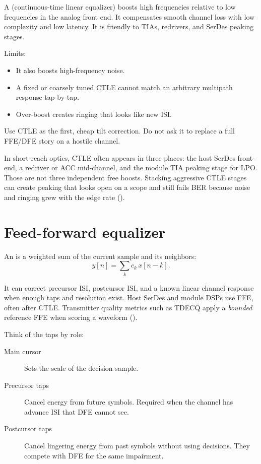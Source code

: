 A  (continuous-time linear equalizer) boosts high
frequencies relative to low frequencies in the analog front end. It compensates
smooth channel loss with low complexity and low latency. It is friendly to
TIAs, redrivers, and SerDes peaking stages.

Limits:

\begin{itemize}
\item It also boosts high-frequency noise.
\item A fixed or coarsely tuned CTLE cannot match an arbitrary multipath
      response tap-by-tap.
\item Over-boost creates ringing that looks like new ISI.
\end{itemize}

Use CTLE as the first, cheap tilt correction. Do not ask it to replace a
full FFE/DFE story on a hostile channel.

In short-reach optics, CTLE often appears in three places: the host SerDes
front-end, a redriver or ACC mid-channel, and the module TIA peaking stage for
LPO. Those are not three independent free boosts. Stacking aggressive CTLE
stages can create peaking that looks open on a scope and still fails BER because
noise and ringing grew with the edge rate ().

\section{Feed-forward equalizer}
\label{sec:eq-ffe}

An  is a weighted sum of the current sample and its
neighbors:
\begin{equation}
y[n] = \sum_k c_k\, x[n-k].
\label{eq:ffe}
\end{equation}

It can correct precursor ISI, postcursor ISI, and a known linear channel
response when enough taps and resolution exist. Host SerDes and module DSPs use
FFE, often after CTLE. Transmitter quality metrics such as TDECQ apply a
\emph{bounded} reference FFE when scoring a waveform ().

Think of the taps by role:

\begin{description}
\item[Main cursor] Sets the scale of the decision sample.
\item[Precursor taps] Cancel energy from future symbols. Required when the
      channel has advance ISI that DFE cannot see.
\item[Postcursor taps] Cancel lingering energy from past symbols without using
      decisions. They compete with DFE for the same impairment.
\end{description}


